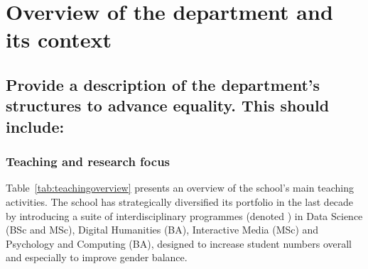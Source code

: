 %
%



\section{Overview of the department and its context}
\label{sec:overview}




\subsection{Provide a description of the department’s structures to advance equality. This should include:}  

\subsubsection{Teaching and research focus}



Table~\ref{tab:teachingoverview} presents an overview of the school's
main teaching activities. 
The school has strategically diversified its portfolio in the
last decade by introducing a suite of interdisciplinary programmes
(denoted \interdis)
in Data Science (BSc and MSc), Digital Humanities (BA), Interactive 
Media (MSc) and Psychology and Computing (BA), designed to increase 
student  numbers overall and  especially to improve gender balance. 


